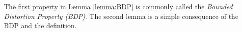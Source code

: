\documentclass{PRM}
\newcommand{\norm}[1]{\left|\left|#1\right|\right|}
\theoremstyle{plain}
\theoremstyle{definition}
\theoremstyle{remark}
\begin{document}

The first property in Lemma \ref{lemma:BDP} is commonly called the \emph{Bounded Distortion Property (BDP)}. The second lemma is a simple consequence of the BDP and the definition.
\end{document}
